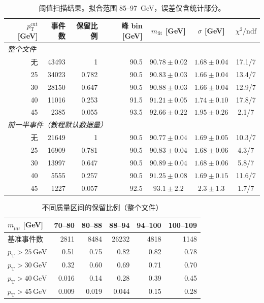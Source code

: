 \documentclass[11pt,a4paper,fontset=windows]{ctexart}
\newcommand{\pT}{p_{\mathrm{T}}}
\newcommand{\mll}{m_{\mu\mu}}
\newcommand{\GeV}{\,\mathrm{GeV}}
\begin{document}
\begin{table}[H]
\centering
\caption{阈值扫描结果。拟合范围 85--97~GeV，误差仅含统计部分。}
\label{tab:scan}
\small
\begin{tabular}{rrrrccc}
\toprule
$\pT^{\mathrm{cut}}$ [GeV] & 事件数 & 保留比例 & 峰 bin [GeV] & $m_{\mathrm{fit}}$ [GeV] & $\sigma$ [GeV] & $\chi^2/\mathrm{ndf}$ \\
\midrule
\multicolumn{7}{l}{\emph{整个文件}} \\
无 & 43493 & 1 & 90.5 & $90.78\pm0.02$ & $1.68\pm0.04$ & 17.1/7 \\
25 & 34023 & 0.782 & 90.5 & $90.83\pm0.03$ & $1.66\pm0.04$ & 13.4/7 \\
30 & 28150 & 0.647 & 90.5 & $90.88\pm0.03$ & $1.66\pm0.04$ & 12.9/7 \\
40 & 11016 & 0.253 & 91.5 & $91.21\pm0.05$ & $1.74\pm0.10$ & 17.8/7 \\
45 & 2385 & 0.055 & 93.5 & $92.66\pm0.22$ & $1.95\pm0.26$ & 2.1/7 \\
\midrule
\multicolumn{7}{l}{\emph{前一半事件（教程默认数据量）}} \\
无 & 21649 & 1 & 90.5 & $90.77\pm0.04$ & $1.69\pm0.05$ & 10.3/7 \\
25 & 16909 & 0.781 & 90.5 & $90.83\pm0.04$ & $1.68\pm0.06$ & 4.3/7 \\
30 & 13997 & 0.647 & 90.5 & $90.89\pm0.04$ & $1.68\pm0.06$ & 5.8/7 \\
40 & 5555 & 0.257 & 90.5 & $91.25\pm0.08$ & $1.69\pm0.15$ & 11.6/7 \\
45 & 1227 & 0.057 & 92.5 & $93.1\pm2.2$ & $2.3\pm1.3$ & 1.7/7 \\
\bottomrule
\end{tabular}
\end{table}

\begin{table}[H]
\centering
\caption{不同质量区间的保留比例（整个文件）}
\label{tab:slices}
\begin{tabular}{lrrrrr}
\toprule
$\mll$ [GeV] & 70--80 & 80--88 & 88--94 & 94--100 & 100--109 \\
\midrule
基准事件数 & 2811 & 8484 & 26232 & 4818 & 1148 \\
$\pT>25\GeV$ & 0.51 & 0.75 & 0.82 & 0.82 & 0.78 \\
$\pT>30\GeV$ & 0.32 & 0.60 & 0.69 & 0.71 & 0.70 \\
$\pT>40\GeV$ & 0.016 & 0.14 & 0.28 & 0.39 & 0.45 \\
$\pT>45\GeV$ & 0.009 & 0.019 & 0.044 & 0.15 & 0.28 \\
\bottomrule
\end{tabular}
\end{table}
\end{document}
